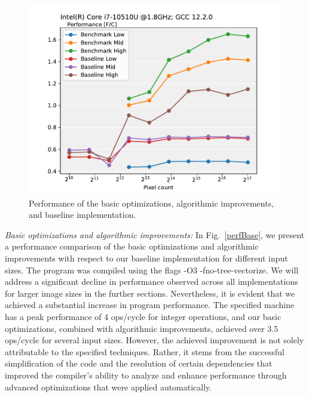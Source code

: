 \documentclass[letterpaper]{article}
\newcommand{\inline}[1]{{\ttfamily\hyphenchar\font=45 #1}}
\begin{document}
\begin{figure}[htbp]
  \centering
    \includegraphics[scale=0.5]{BenchmarkPerformance.pdf}
    \caption{Performance of the basic optimizations, algorithmic improvements, and baseline implementation.
    \label{BenchmarkPerformance}}
  \end{figure}

\textit{Basic optimizations and algorithmic improvements:} In Fig.~\ref{perfBase}, we present a performance comparison of the basic optimizations and algorithmic improvements with respect to our baseline implementation for different input sizes. The program was compiled using the flags \inline{-O3 -fno-tree-vectorize}. We will address a significant decline in performance observed across all implementations for larger image sizes in the further sections. Nevertheless, it is evident that we achieved a substantial increase in program performance. The specified machine has a peak performance of 4 ops/cycle for integer operations, and our basic optimizations, combined with algorithmic improvements, achieved over 3.5 ops/cycle for several input sizes. However, the achieved improvement is not solely attributable to the specified techniques. Rather, it stems from the successful simplification of the code and the resolution of certain dependencies that improved the compiler’s ability to analyze and enhance performance through advanced optimizations that were applied automatically.
\end{document}
